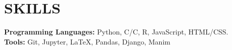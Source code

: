 \documentclass[letterpaper, 9pt]{extarticle}
\newcommand{\CPP}{C\nolinebreak\hspace{-.05em}\raisebox{.4ex}{\tiny\bf +}\nolinebreak\hspace{-.10em}\raisebox{.4ex}{\tiny\bf +}}
\begin{document}


   

\section*{SKILLS}
\textbf{Programming Languages:} Python, C/\CPP\@, R, JavaScript, HTML/CSS. \\
\textbf{Tools:} Git, Jupyter, \LaTeX, Pandas, Django, Manim
\end{document}
